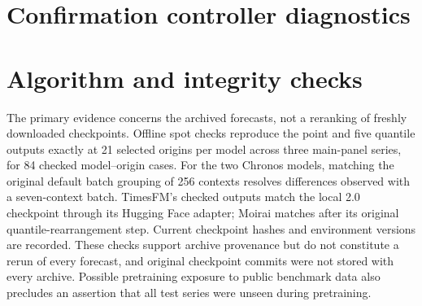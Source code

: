 \documentclass[preprint,11pt]{elsarticle}
\begin{document}
\clearpage
\section{Confirmation controller diagnostics}\label{app:confirmation}
\begin{table}[htbp]\centering\scriptsize
\caption{Confirmation contrasts at $h=24$. Each row contains four series and two models.
Gain and median are paired interval-score improvements (\%); A is the first method in
the comparison and B the second. Coverage is in percent, target 90\%. Correlated pairs
are retained without interpreting the win count as independent replications.}
\label{tab:confirmation}
\end{table}

\begin{table}[h!]\centering\scriptsize
\caption{Unified comparison on the revisited panel at $h=24$. IS ratio averages
per-pair interval scores divided by that pair's residual rolling-quantile score;
lower is better. Family coverage is percent (target 90\%). Local is the family-balanced
150-origin absolute coverage error in percentage points; Singleton is percent.
Original rows retain locked-grid results, wide ACI and multi-step PID are subsequent
sensitivities. PI-log and SF-OGD retain fixed defaults, not tuned optima.}

\end{table}

\clearpage
\section{Algorithm and integrity checks}\label{app:integrity}
The primary evidence concerns the archived forecasts, not a reranking of freshly
downloaded checkpoints. Offline spot checks reproduce the point and five quantile outputs
exactly at 21 selected origins per model across three main-panel series, for 84 checked
model--origin cases. For the two Chronos models, matching the original default batch
grouping of 256 contexts resolves differences observed with a seven-context batch.
TimesFM's checked outputs match the local 2.0 checkpoint through its Hugging Face adapter;
Moirai matches after its original quantile-rearrangement step. Current checkpoint hashes
and environment versions are recorded. These checks support archive provenance but
do not constitute a rerun of every forecast, and original checkpoint commits were not
stored with every archive. Possible pretraining exposure to
public benchmark data also precludes an assertion that all test series were unseen during
pretraining.
\end{document}
